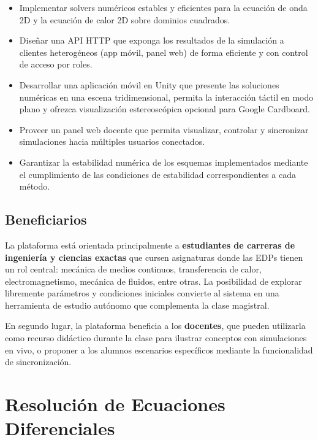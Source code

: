 \documentclass[12pt, a4paper]{article}
\begin{document}
\begin{itemize}
    \item Implementar solvers numéricos estables y eficientes para la ecuación de onda
    2D y la ecuación de calor 2D sobre dominios cuadrados.

    \item Diseñar una API HTTP que exponga los resultados de la simulación a clientes
    heterogéneos (app móvil, panel web) de forma eficiente y con control de acceso por
    roles.

    \item Desarrollar una aplicación móvil en Unity que presente las soluciones
    numéricas en una escena tridimensional, permita la interacción táctil en modo plano
    y ofrezca visualización estereoscópica opcional para Google Cardboard.

    \item Proveer un panel web docente que permita visualizar, controlar y sincronizar
    simulaciones hacia múltiples usuarios conectados.

    \item Garantizar la estabilidad numérica de los esquemas implementados mediante el
    cumplimiento de las condiciones de estabilidad correspondientes a cada método.
\end{itemize}

\subsection{Beneficiarios}

La plataforma está orientada principalmente a \textbf{estudiantes de carreras de
ingeniería y ciencias exactas} que cursen asignaturas donde las EDPs tienen un rol
central: mecánica de medios continuos, transferencia de calor, electromagnetismo,
mecánica de fluidos, entre otras. La posibilidad de explorar libremente parámetros y
condiciones iniciales convierte al sistema en una herramienta de estudio autónomo que
complementa la clase magistral.

En segundo lugar, la plataforma beneficia a los \textbf{docentes}, que pueden utilizarla
como recurso didáctico durante la clase para ilustrar conceptos con simulaciones en
vivo, o proponer a los alumnos escenarios específicos mediante la funcionalidad de
sincronización.

\newpage

\section{Resolución de Ecuaciones Diferenciales}
\end{document}
